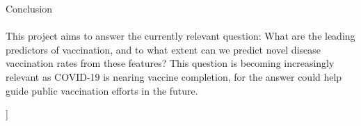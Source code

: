 \documentclass{IEEEtran}
\begin{document}
\begin{@twocolumnfalse}
{\huge Conclusion}\\\\
This project aims to answer the currently relevant question: What are the leading predictors of vaccination, and to what extent can we predict novel disease vaccination rates from these features? This question is becoming increasingly relevant as COVID-19 is nearing vaccine completion, for the answer could help guide public vaccination efforts in the future. 
\end{@twocolumnfalse}
]

\end{document}
